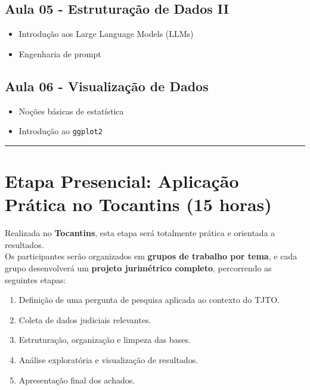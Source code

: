 \documentclass[
  letterpaper,
  DIV=11,
  numbers=noendperiod]{scrreprt}
\providecommand{\tightlist}{%
  \setlength{\itemsep}{0pt}\setlength{\parskip}{0pt}}
\begin{document}
\subsection{Aula 05 - Estruturação de Dados
II}\label{aula-05---estruturauxe7uxe3o-de-dados-ii}

\begin{itemize}
\tightlist
\item
  Introdução aos Large Language Models (LLMs)\\
\item
  Engenharia de prompt
\end{itemize}

\subsection{Aula 06 - Visualização de
Dados}\label{aula-06---visualizauxe7uxe3o-de-dados}

\begin{itemize}
\tightlist
\item
  Noções básicas de estatística\\
\item
  Introdução ao \texttt{ggplot2}
\end{itemize}

\begin{center}\rule{0.5\linewidth}{0.5pt}\end{center}

\section{Etapa Presencial: Aplicação Prática no Tocantins (15
horas)}\label{etapa-presencial-aplicauxe7uxe3o-pruxe1tica-no-tocantins-15-horas}

Realizada no \textbf{Tocantins}, esta etapa será totalmente prática e
orientada a resultados.\\
Os participantes serão organizados em \textbf{grupos de trabalho por
tema}, e cada grupo desenvolverá um \textbf{projeto jurimétrico
completo}, percorrendo as seguintes etapas:

\begin{enumerate}
\def\labelenumi{\arabic{enumi}.}
\tightlist
\item
  Definição de uma pergunta de pesquisa aplicada ao contexto do TJTO.\\
\item
  Coleta de dados judiciais relevantes.\\
\item
  Estruturação, organização e limpeza das bases.\\
\item
  Análise exploratória e visualização de resultados.\\
\item
  Apresentação final dos achados.
\end{enumerate}
\end{document}
